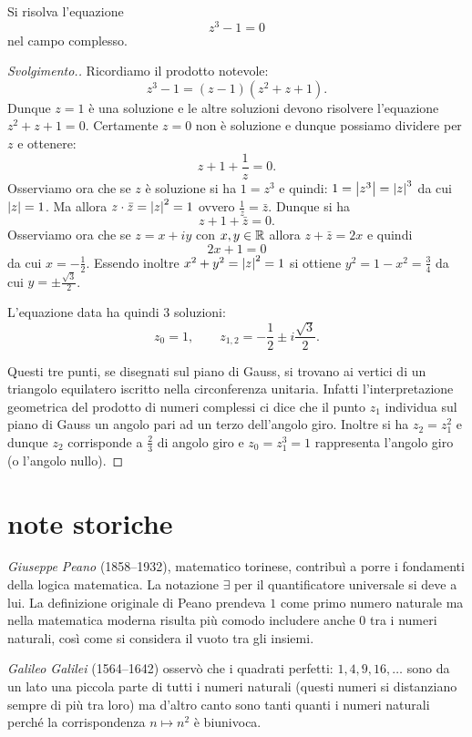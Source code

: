 \begin{exercise}
Si risolva l'equazione 
\[ 
 z^3 - 1 = 0
\]
nel campo complesso.
\end{exercise}
%
\begin{proof}[Svolgimento.]
Ricordiamo il prodotto notevole:
\[
  z^3 - 1 = (z-1)(z^2+z+1).
\]
Dunque $z=1$ è una soluzione e le altre soluzioni devono risolvere 
l'equazione $z^2+z+1=0$. 
Certamente $z=0$ non è soluzione e dunque possiamo dividere per $z$ 
e ottenere:
\[
  z + 1 + \frac 1 z = 0.
\]
Osserviamo ora che se $z$ è soluzione si ha $1=z^3$
e quindi: $1 = {\left|z^3\right|}= {\left|z\right|}^3$ da cui ${\left|z\right|} = 1$.
Ma allora $z\cdot \bar z = {\left|z\right|}^2 = 1$ ovvero $\frac 1 z = \bar z$.
Dunque si ha 
\[
    z + 1 + \bar z = 0.
\]
Osserviamo ora che se $z=x+iy$ con $x,y\in {\mathbb R}$ allora $z+\bar z = 2x$
e quindi 
\[
    2x + 1 = 0 
\]
da cui $x=-\frac 1 2$. Essendo inoltre $x^2+y^2={\left|z\right|}^2=1$ si ottiene
$y^2 = 1-x^2 = \frac 3 4$ da cui $y=\pm \frac{\sqrt 3}{2}$.

L'equazione data ha quindi $3$ soluzioni:
\[
z_0 = 1, \qquad 
z_{1,2} = -\frac 1 2 \pm i \frac{\sqrt 3} 2.
\]

Questi tre punti, se disegnati sul piano di Gauss, si trovano 
ai vertici di un triangolo equilatero iscritto nella circonferenza unitaria.
Infatti l'interpretazione geometrica del prodotto di numeri complessi ci dice 
che il punto $z_1$ individua sul piano di Gauss un angolo pari 
ad un terzo dell'angolo giro. Inoltre si ha $z_2 = z_1^2$ e dunque 
$z_2$ corrisponde a $\frac 2 3$ di angolo giro e $z_0=z_1^3 = 1$ rappresenta 
l'angolo giro (o l'angolo nullo).
\end{proof}

\section{note storiche}

\label{nota:Peano}%
%
\emph{Giuseppe Peano} (1858--1932), matematico torinese, contribuì a porre 
i fondamenti della logica matematica. 
La notazione $\exists$ per il quantificatore universale si deve a lui.
La definizione originale di Peano prendeva $1$ come primo numero
naturale ma nella matematica moderna risulta più comodo includere anche $0$ 
tra i numeri naturali, così come si considera il vuoto tra gli insiemi.

\label{nota:Galileo}%
%
\emph{Galileo Galilei} (1564--1642) osservò che i quadrati 
perfetti: $1,4,9,16,\dots$ sono da un lato una piccola parte 
di tutti i numeri naturali (questi numeri si distanziano 
sempre di più tra loro) ma d'altro canto sono tanti quanti i numeri naturali 
perché la corrispondenza $n\mapsto n^2$ è biunivoca.

